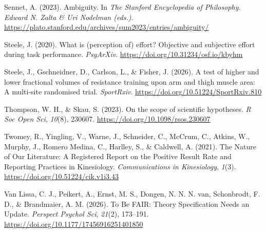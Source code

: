 \documentclass[
]{article}
\newlength{\cslhangindent}
\newenvironment{CSLReferences}[2] %
 {\begin{list}{}{%
  \setlength{\itemindent}{0pt}
  \setlength{\leftmargin}{0pt}
  \setlength{\parsep}{0pt}
  \ifodd #1
   \setlength{\leftmargin}{\cslhangindent}
   \setlength{\itemindent}{-1\cslhangindent}
  \fi
  \setlength{\itemsep}{#2\baselineskip}}}
 {\end{list}}
\begin{document}
\begin{CSLReferences}{1}{0}
Sennet, A. (2023). Ambiguity. In \emph{The Stanford Encyclopedia of
Philosophy. Edward N. Zalta \& Uri Nodelman (eds.)}.
\url{https://plato.stanford.edu/archives/sum2023/entries/ambiguity/}

Steele, J. (2020). What is (perception of) effort? {Objective} and
subjective effort during task performance. \emph{PsyArXiv}.
\url{https://doi.org/10.31234/osf.io/kbyhm}

Steele, J., Gschneidner, D., Carlson, L., \& Fisher, J. (2026). A test
of higher and lower fractional volumes of resistance training upon arm
and thigh muscle area: {A} multi-site randomised trial.
\emph{SportRxiv}. \url{https://doi.org/10.51224/SportRxiv.810}

Thompson, W. H., \& Skau, S. (2023). On the scope of scientific
hypotheses. \emph{R Soc Open Sci}, \emph{10}(8), 230607.
\url{https://doi.org/10.1098/rsos.230607}

Twomey, R., Yingling, V., Warne, J., Schneider, C., McCrum, C., Atkins,
W., Murphy, J., Romero Medina, C., Harlley, S., \& Caldwell, A. (2021).
The {Nature} of {Our} {Literature}: {A} {Registered} {Report} on the
{Positive} {Result} {Rate} and {Reporting} {Practices} in {Kinesiology}.
\emph{Communications in Kinesiology}, \emph{1}(3).
\url{https://doi.org/10.51224/cik.v1i3.43}

Van Lissa, C. J., Peikert, A., Ernst, M. S., Dongen, N. N. N. van,
Schonbrodt, F. D., \& Brandmaier, A. M. (2026). To {Be} {FAIR}: {Theory}
{Specification} {Needs} an {Update}. \emph{Perspect Psychol Sci},
\emph{21}(2), 173--191. \url{https://doi.org/10.1177/17456916251401850}

\end{CSLReferences}
\end{document}
